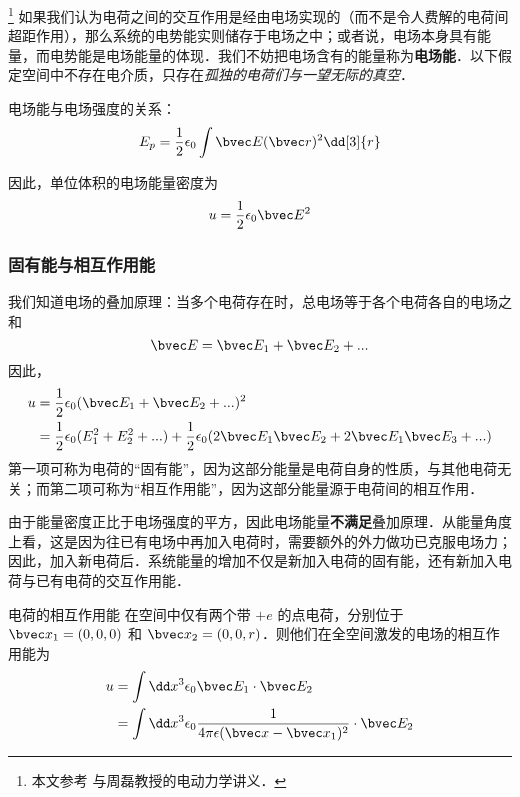 
\footnote{本文参考 \cite{GriffE} 与周磊教授的电动力学讲义．}
如果我们认为电荷之间的交互作用是经由电场实现的（而不是令人费解的电荷间超距作用），那么系统的电势能实则储存于电场之中；或者说，电场本身具有能量，而电势能是电场能量的体现．我们不妨把电场含有的能量称为\textbf{电场能}．以下假定空间中不存在电介质，只存在\textsl{孤独的电荷们与一望无际的真空}．

电场能与电场强度的关系：
\begin{equation}\label{EEng_eq2}
E_p = \frac12 \epsilon_0 \int \bvec E(\bvec r)^2 \dd[3]{r}
\end{equation}

因此，单位体积的电场能量密度为
\begin{equation}
u = \frac12 \epsilon_0 \bvec E^2
\end{equation}

\subsubsection{固有能与相互作用能}
我们知道电场的叠加原理：当多个电荷存在时，总电场等于各个电荷各自的电场之和
$$
\bvec E = \bvec E_1 + \bvec E_2 +... 
$$
因此，
$$
\begin{aligned}
u &= \frac12 \epsilon_0 (\bvec E_1 + \bvec E_2 +... )^2\\
&=\frac12 \epsilon_0(E_1^2+E_2^2+...)+\frac12 \epsilon_0 (2\bvec E_1 \bvec E_2+2\bvec E_1 \bvec E_3+...)
\end{aligned}
$$
第一项可称为电荷的“固有能”，因为这部分能量是电荷自身的性质，与其他电荷无关；而第二项可称为“相互作用能”，因为这部分能量源于电荷间的相互作用．

由于能量密度正比于电场强度的平方，因此电场能量\textbf{不满足}叠加原理．从能量角度上看，这是因为往已有电场中再加入电荷时，需要额外的外力做功已克服电场力；因此，加入新电荷后．系统能量的增加不仅是新加入电荷的固有能，还有新加入电荷与已有电荷的交互作用能．
\begin{exercise}{电荷的相互作用能}
在空间中仅有两个带 $+e$ 的点电荷，分别位于 $\bvec x_1=(0,0,0)$ 和 $\bvec x_2=(0,0,r)$．则他们在全空间激发的电场的相互作用能为
\begin{equation}
\begin{aligned}
u&=\int \dd x^3 \epsilon_0 \bvec E_1\cdot \bvec E_2\\
&=\int \dd x^3 \epsilon_0 \frac{1}{4\pi\epsilon(\bvec x-\bvec x_1)^2}\cdot \bvec E_2
\end{aligned}
\end{equation}
\end{exercise}

